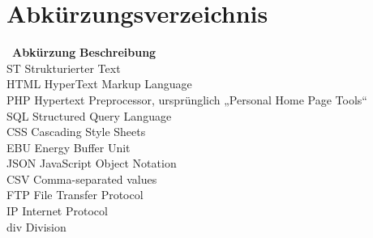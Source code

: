 
\chapter*{Abkürzungsverzeichnis}\thispagestyle{fancy}

\begin{tabbing}
\ \= \textbf{Abkürzung} \hspace{0.5cm} \= \textbf{Beschreibung} \kill
\\
\> ST \>   Strukturierter Text\\
\> HTML \>  HyperText Markup Language \\
\> PHP \>   Hypertext Preprocessor, ursprünglich „Personal Home Page Tools“\\
\> SQL \>   Structured Query Language\\
\> CSS \>   Cascading Style Sheets\\
\> EBU \>   Energy Buffer Unit\\
\> JSON \>   JavaScript Object Notation\\
\> CSV \>   Comma-separated values\\
\> FTP \>   File Transfer Protocol\\
\> IP \>   Internet Protocol\\
\> div \>   Division\\

\end{tabbing}
